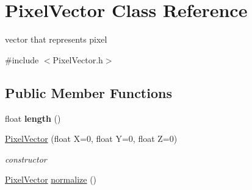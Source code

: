 \hypertarget{class_pixel_vector}{
\section{\-Pixel\-Vector \-Class \-Reference}
\label{class_pixel_vector}
}


vector that represents pixel  




{\ttfamily \#include $<$\-Pixel\-Vector.\-h$>$}

\subsection*{\-Public \-Member \-Functions}
\begin{DoxyCompactItemize}
\item 
\hypertarget{class_pixel_vector_a4482de7867b1cca4fc3c79ac4e9ed057}{
float {\bfseries length} ()}
\label{class_pixel_vector_a4482de7867b1cca4fc3c79ac4e9ed057}

\item 
\hyperlink{class_pixel_vector_a577cd482cb3883a07e8132deed2867a5}{\-Pixel\-Vector} (float \-X=0, float \-Y=0, float \-Z=0)
\begin{DoxyCompactList}\small\item\em constructor \end{DoxyCompactList}\item 
\hypertarget{class_pixel_vector_a22b1262e2f2735656dce067bb2c4ec2c}{
\hyperlink{class_pixel_vector}{\-Pixel\-Vector} \hyperlink{class_pixel_vector_a22b1262e2f2735656dce067bb2c4ec2c}{normalize} ()}
\label{class_pixel_vector_a22b1262e2f2735656dce067bb2c4ec2c}


\end{DoxyCompactItemize}
